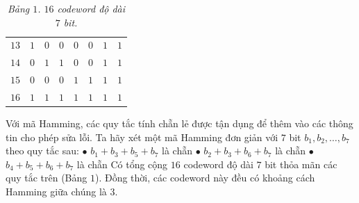 \begin{multicols}{2}
\begin{table}[H]
\begin{tabular}{c c c c c c c c}
			$13$ &$1$&$0$&$0$&$0$&$0$&$1$&$1$\\
			$14$ &$0$&$1$&$1$&$0$&$0$&$1$&$1$\\
			$15$ &$0$&$0$&$0$&$1$&$1$&$1$&$1$\\
			$16$ &$1$&$1$&$1$&$1$&$1$&$1$&$1$\\
			\hline
		\end{tabular}	
		\caption{\small\textit{\color{toanhocdoisong}Bảng $1$. $16$ codeword độ dài $7$ bit.}}
		\vspace*{-10pt}
	\end{table}
	Với mã Hamming, các quy tắc tính chẵn lẻ được tận dụng để thêm vào các thông tin cho phép sửa lỗi. Ta hãy xét một mã Hamming đơn giản với $7$ bit $b_1,b_2,\ldots,b_7$ theo quy tắc sau:
	\vskip 0.05cm
	$\bullet$ $b_1+b_3+b_5+b_7$ là chẵn
	\vskip 0.05cm
	$\bullet$ $b_2+b_3+b_6+b_7$ là chẵn
	\vskip 0.05cm
	$\bullet$ $b_4+b_5+b_6+b_7$ là chẵn
	\vskip 0.05cm
	Có tổng cộng $16$ codeword độ dài $7$ bit thỏa mãn các quy tắc trên (Bảng $1$). Đồng thời, các codeword này đều có khoảng cách Hamming giữa chúng là $3$.
	

\end{multicols}
